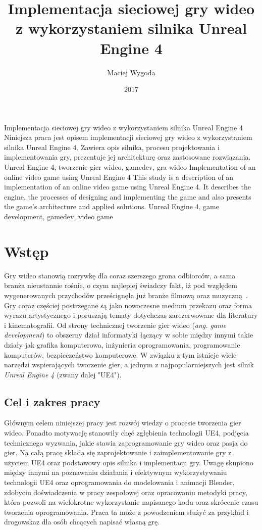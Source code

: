 \documentclass[multip]{SGGW-thesis}
\title{Implementacja sieciowej gry wideo z wykorzystaniem silnika Unreal Engine 4}
\author{Maciej Wygoda}
\date{2017}
\begin{document}
\maketitle
{}
\statementpage
\abstractpage
{Implementacja sieciowej gry wideo z wykorzystaniem silnika Unreal Engine 4}
{Niniejsza praca jest opisem implementacji sieciowej gry wideo z wykorzystaniem silnika Unreal Engine 4. Zawiera opis silnika, procesu projektowania i implementowania gry, prezentuje jej architekturę oraz zastosowane rozwiązania.}
{Unreal Engine 4, tworzenie gier wideo, gamedev, gra wideo}
{Implementation of an online video game using Unreal Engine 4}
{This study is a description of an implementation of an online video game using Unreal Engine 4. It describes the engine, the processes of designing and implementing the game and also presents the game's architecture and applied solutions.}
{Unreal Engine 4, game development, gamedev, video game}

\tableofcontents

\chapter{Wstęp}
Gry wideo stanowią rozrywkę dla coraz szerszego grona odbiorców, a sama branża nieustannie rośnie, o czym najlepiej świadczy fakt, iż pod względem wygenerowanych przychodów prześcignęła już branże filmową oraz muzyczną~\cite{nasdaq-video-games-industry}. Gry coraz częściej postrzegane są jako nowoczesne medium przekazu oraz forma wyrazu artystycznego i poruszają tematy dotychczas zarezerwowane dla literatury i kinematografii. 
\newline Od strony technicznej tworzenie gier wideo ({\em ang. game development}) to obszerny dział informatyki łączący w sobie między innymi takie działy jak grafika komputerowa, inżynieria oprogramowania, programowanie komputerów, bezpieczeństwo komputerowe. W związku z tym istnieje wiele narzędzi wspierających tworzenie gier, a jednym z najpopularniejszych jest silnik {\em Unreal Engine 4} (zwany dalej "UE4").
\section{Cel i zakres pracy}
Głównym celem niniejszej pracy jest rozwój wiedzy o procesie tworzenia gier wideo. Ponadto motywację stanowiły chęć zgłębienia technologii UE4, podjęcia technicznego wyzwania, jakie stawia zaprogramowanie gry wideo oraz pasja do gier. Na całą pracę składa się zaprojektowanie i zaimplementowanie gry z użyciem UE4 oraz podstawowy opis silnika i implementacji gry. 
\newline Uwagę skupiono między innymi na poznawaniu działania i efektywnym wykorzystywaniu technologii UE4 oraz oprogramowania do modelowania i animacji Blender, zdobyciu doświadczenia w pracy zespołowej oraz opracowaniu metodyki pracy, która pozwoli na wielokrotne wykorzystanie napisanego kodu oraz skrócenie czasu tworzenia oprogramowania.
\newline Praca ta może z powodzeniem służyć za przykład i drogowskaz dla osób chcących napisać własną grę.
\end{document}
